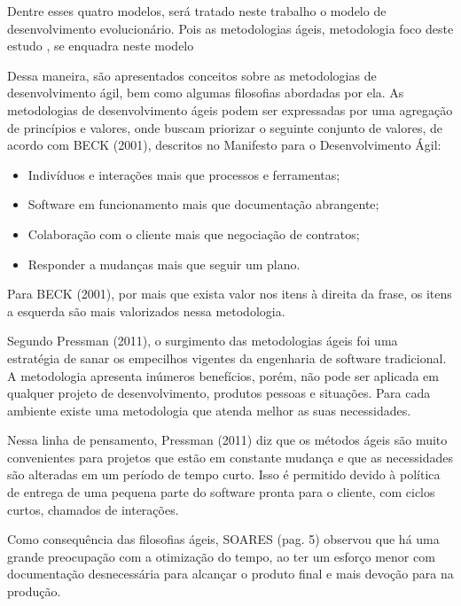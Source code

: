 Dentre esses quatro modelos, será tratado neste trabalho o modelo de desenvolvimento 
evolucionário. Pois as metodologias ágeis, metodologia foco deste estudo
, se enquadra neste modelo


Dessa maneira, são apresentados conceitos sobre as metodologias de desenvolvimento ágil, bem como algumas filosofias abordadas por ela.
As metodologias de desenvolvimento ágeis podem ser expressadas por uma agregação de princípios e valores, onde buscam priorizar o seguinte conjunto de valores, de acordo com BECK (2001), descritos no Manifesto para o Desenvolvimento Ágil:


\begin{itemize}
    \item Indivíduos e interações mais que processos e ferramentas;
    \item Software em funcionamento mais que documentação abrangente;
    \item Colaboração com o cliente mais que negociação de contratos;
    \item Responder a mudanças mais que seguir um plano.
\end{itemize}

Para BECK (2001), por mais que exista valor nos itens à direita da frase, os itens a esquerda são mais valorizados nessa metodologia.

Segundo Pressman (2011), o surgimento das metodologias ágeis foi uma estratégia de sanar os empecilhos vigentes da engenharia de software tradicional. A metodologia apresenta inúmeros benefícios, porém, não pode ser aplicada em qualquer projeto de desenvolvimento, produtos pessoas e situações. Para cada ambiente existe uma metodologia que atenda melhor as suas necessidades.

Nessa linha de pensamento, Pressman (2011) diz que os métodos ágeis são muito convenientes para projetos que estão em constante mudança e que as necessidades são alteradas em um período de tempo curto. Isso é permitido devido à política de entrega de uma pequena parte do software pronta para o cliente, com ciclos curtos, chamados de interações.

Como consequência das filosofias ágeis, SOARES (pag. 5) observou que há uma grande preocupação com a otimização do tempo, ao ter um esforço menor com documentação desnecessária para alcançar o produto final e mais devoção para na produção.

